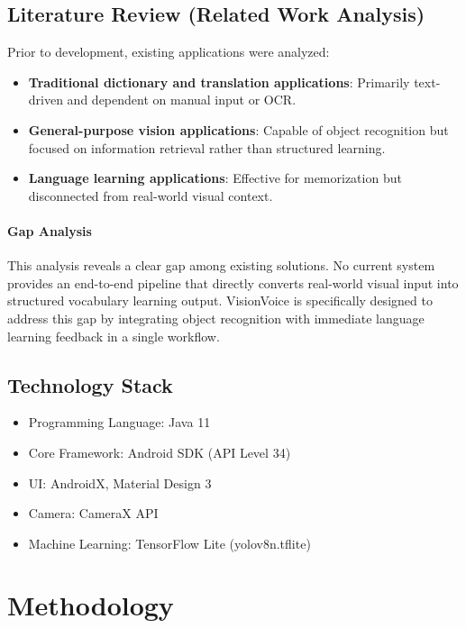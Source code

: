 \documentclass[a4paper, 12pt]{article}
\begin{document}
    \subsection{Literature Review (Related Work Analysis)}
    Prior to development, existing applications were analyzed:

    \begin{itemize}
        \item \textbf{Traditional dictionary and translation applications}: Primarily text-driven and dependent on manual input or OCR.
        \item \textbf{General-purpose vision applications}: Capable of object recognition but focused on information retrieval rather than structured learning.
        \item \textbf{Language learning applications}: Effective for memorization but disconnected from real-world visual context.
    \end{itemize}

    \paragraph{Gap Analysis}
    This analysis reveals a clear gap among existing solutions. No current system provides an end-to-end pipeline that directly converts real-world visual input into structured vocabulary learning output. VisionVoice is specifically designed to address this gap by integrating object recognition with immediate language learning feedback in a single workflow.

    \subsection{Technology Stack}
    \begin{itemize}
        \item Programming Language: Java 11
        \item Core Framework: Android SDK (API Level 34)
        \item UI: AndroidX, Material Design 3
        \item Camera: CameraX API
        \item Machine Learning: TensorFlow Lite (yolov8n.tflite)
    \end{itemize}

    \section{Methodology}
\end{document}
